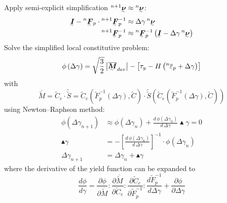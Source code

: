 Apply semi-explicit simplification 
\(\prescript{n+1}{}{\utilde{\nu}} \approx \prescript{n}{}{\utilde{\nu}}\):
\begin{align}
  \utilde{I} - \prescript{n}{}{\utilde{F}}_{p} \cdot
  \prescript{n+1}{}{\utilde{F}}_{p}^{-1} &\approx
  \Delta \gamma \prescript{n}{}{\utilde{\nu}} \\
  \prescript{n+1}{}{\utilde{F}}_{p}^{-1} &\approx
  \prescript{n}{}{\utilde{F}}_{p}^{-1} \left( \utilde{I} -
  \Delta \gamma \prescript{n}{}{\utilde{\nu}} \right)
\end{align}
Solve the simplified local constitutive problem:
\begin{equation}
  \label{eq:local}
  \phi \left( \Delta \gamma \right) = \sqrt{\frac{3}{2}} 
  \left| \overline{\utilde{M}}_{dev} \right| - \left[ \tau_{y} - 
    H \left( \prescript{n}{}{\overline{\varepsilon}_{p}} + \Delta \gamma\right) \right]
\end{equation}
with 
\begin{equation}
  \label{eq:Mexplicit}
  \overline{\utilde{M}} = \utilde{C}_{e} \cdot \widetilde{\utilde{S}} = 
  \utilde{C}_{e} \left( \utilde{F}_{p}^{-1} \left( \Delta \gamma \right),
    \utilde{C} \right) \cdot
  \widetilde{\utilde{S}} \left( \utilde{C}_{e}
    \left( \utilde{F}_{p}^{-1} \left( \Delta \gamma \right), \utilde{C} \right)
  \right)
\end{equation}
using Newton--Raphson method:
\begin{align}
  \phi \left( \Delta \gamma_{n+1} \right) &\approx 
                                            \phi \left( \Delta \gamma_{n} \right) +
                                            \frac{d \, \phi \left( 
                                            \Delta \gamma_{n} \right)}{d \,
                                            \Delta \gamma} \blacktriangle \gamma 
                                            = 0 \\
  \blacktriangle \gamma &= - \left[ \frac{d \, \phi \left( 
                          \Delta \gamma_{n} \right)}{d \, \Delta \gamma} 
                          \right]^{-1} \cdot \phi \left( \Delta \gamma_{n} \right)\\
  \Delta \gamma_{n+1} &= \Delta \gamma_{n} + \blacktriangle \gamma
\end{align}
where the derivative of the yield function can be expanded to
\begin{equation}
  \label{eq:yield-deriv}
  \frac{d \phi}{d \gamma} = \frac{\partial \phi}{\partial \overline{\utilde{M}}} :
  \frac{\partial \overline{\utilde{M}}}{\partial \utilde{C}_{e}} :
  \frac{\partial \utilde{C}_{e}}{\partial \utilde{F}_{p}^{-1}} :
  \frac{d \utilde{F}_{p}^{-1}}{d \Delta \gamma} + 
  \frac{\partial \phi}{\partial \Delta \gamma}
\end{equation}
